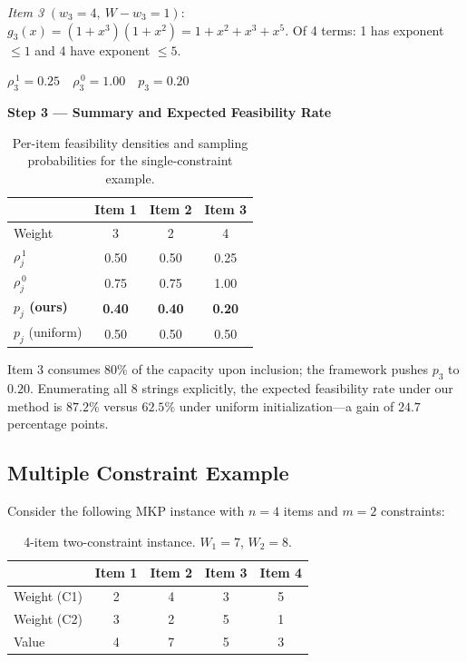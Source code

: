 \documentclass[twocolumn]{article}
\begin{document}
\noindent \textit{Item 3} $(w_3 = 4,\ W - w_3 = 1)$:
$g_3(x) = (1 + x^3)(1 + x^2) = 1 + x^2 + x^3 + x^5$. 
Of 4 terms: 1 has exponent $\leq 1$ and 4 have exponent $\leq 5$.

\begin{flushleft}
\hspace{2em}$\rho_{3}^{\,1} = 0.25 \quad 
\rho_{3}^{\,0} = 1.00 \quad
p_3 = 0.20$
\end{flushleft}

\noindent \textbf{Step 3 --- Summary and Expected Feasibility Rate}

\begin{table}[H]
\centering
\begin{tabular}{lccc}
\toprule
 & Item 1 & Item 2 & Item 3 \\
\midrule
Weight                          & 3    & 2    & 4    \\
$\rho_{j}^{\,1}$                & 0.50 & 0.50 & 0.25 \\
$\rho_{j}^{\,0}$                & 0.75 & 0.75 & 1.00 \\
\textbf{$p_j$ (ours)}           & \textbf{0.40} & \textbf{0.40} & \textbf{0.20} \\
$p_j$ (uniform)                 & 0.50 & 0.50 & 0.50 \\
\bottomrule
\end{tabular}
\caption{Per-item feasibility densities and sampling probabilities 
for the single-constraint example.}
\end{table}

Item 3 consumes 80\% of the capacity upon inclusion; the framework 
pushes $p_3$ to $0.20$. Enumerating all 8 strings explicitly, the 
expected feasibility rate under our method is $\mathbf{87.2\%}$ 
versus $62.5\%$ under uniform initialization---a gain of $24.7$ 
percentage points.

\subsection{Multiple Constraint Example}

Consider the following MKP instance with $n = 4$ items 
and $m = 2$ constraints:

\begin{table}[H]
\centering
\begin{tabular}{lcccc}
\toprule
 & Item 1 & Item 2 & Item 3 & Item 4 \\
\midrule
Weight (C1) & 2 & 4 & 3 & 5 \\
Weight (C2) & 3 & 2 & 5 & 1 \\
Value       & 4 & 7 & 5 & 3 \\
\bottomrule
\end{tabular}
\caption{4-item two-constraint instance. $W_1 = 7$, $W_2 = 8$.}
\end{table}
\end{document}
